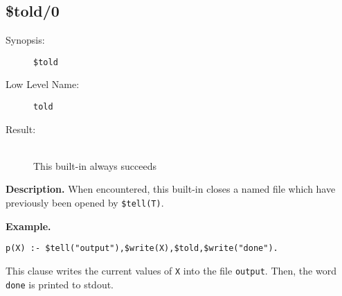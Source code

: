 %
%
%
\subsection{\$told/0}

\begin{description}
\item[Synopsis:]
	{\tt \$told}
\item[Low Level Name:]
	{\tt told}
\item[Result:]\ \\
This built-in always succeeds
\end{description}

\vspace*{0.5cm}
\noindent
{\bf Description.}
When encountered, this built-in closes a named file which have previously
been opened by {\tt \$tell(T)}.

\vspace*{0.5cm}
\noindent
{\bf Example.}
\begin{verbatim}
p(X) :- $tell("output"),$write(X),$told,$write("done").
\end{verbatim}
This clause writes the current values of {\tt X} into the file
{\tt output}. Then, the word {\tt done} is printed to stdout.


